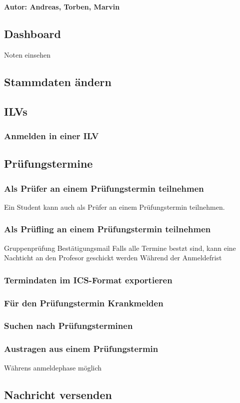 \textbf{Autor: Andreas, Torben, Marvin}

\subsection{Dashboard}
Noten einsehen

\subsection{Stammdaten ändern}

\subsection{ILVs}
\subsubsection{Anmelden in einer ILV}

\subsection{Prüfungstermine}

\subsubsection{Als Prüfer an einem Prüfungstermin teilnehmen}
Ein Student kann auch als Prüfer an einem Prüfungstermin teilnehmen. 
\subsubsection{Als Prüfling an einem Prüfungstermin teilnehmen}
Gruppenprüfung 
Bestätigungsmail
Falls alle Termine bestzt sind, kann eine Nachticht an den Profesor geschickt werden
Während der Anmeldefrist
\subsubsection{Termindaten im ICS-Format exportieren}
\subsubsection{Für den Prüfungstermin Krankmelden}
\subsubsection{Suchen nach Prüfungsterminen}
\subsubsection{Austragen aus einem Prüfungstermin}
Währens anmeldephase möglich


\subsection{Nachricht versenden}


